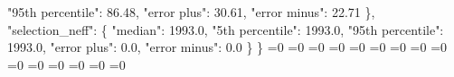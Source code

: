 {{        "95th percentile": 86.48, %
        "error plus": 30.61, %
        "error minus": 22.71%
      \}, %
      "selection\_neff": \{%
        "median": 1993.0, %
        "5th percentile": 1993.0, %
        "95th percentile": 1993.0, %
        "error plus": 0.0, %
        "error minus": 0.0%
      \}%
    \}}%
  \else%
    \ifnum{}=0%
      \let\MagTruncnormIidTiltIsotropicTruncnormNnd@I@out\MagTruncnormIidTiltIsotropicTruncnormNnd@III%
    \else%
      \ifnum{}=0%
      \let\MagTruncnormIidTiltIsotropicTruncnormNnd@I@out\MagTruncnormIidTiltIsotropicTruncnormNnd@IV%
    \else%
      \ifnum{}=0%
      \let\MagTruncnormIidTiltIsotropicTruncnormNnd@I@out\MagTruncnormIidTiltIsotropicTruncnormNnd@V%
    \else%
      \ifnum{}=0%
      \let\MagTruncnormIidTiltIsotropicTruncnormNnd@I@out\MagTruncnormIidTiltIsotropicTruncnormNnd@VI%
    \else%
      \ifnum{}=0%
      \let\MagTruncnormIidTiltIsotropicTruncnormNnd@I@out\MagTruncnormIidTiltIsotropicTruncnormNnd@VII%
    \else%
      \ifnum{}=0%
      \let\MagTruncnormIidTiltIsotropicTruncnormNnd@I@out\MagTruncnormIidTiltIsotropicTruncnormNnd@VIII%
    \else%
      \ifnum{}=0%
      \let\MagTruncnormIidTiltIsotropicTruncnormNnd@I@out\MagTruncnormIidTiltIsotropicTruncnormNnd@IX%
    \else%
      \ifnum{}=0%
      \let\MagTruncnormIidTiltIsotropicTruncnormNnd@I@out\MagTruncnormIidTiltIsotropicTruncnormNnd@X%
    \else%
      \ifnum{}=0%
      \let\MagTruncnormIidTiltIsotropicTruncnormNnd@I@out\MagTruncnormIidTiltIsotropicTruncnormNnd@XI%
    \else%
      \ifnum{}=0%
      \let\MagTruncnormIidTiltIsotropicTruncnormNnd@I@out\MagTruncnormIidTiltIsotropicTruncnormNnd@XII%
    \else%
      \ifnum{}=0%
      \let\MagTruncnormIidTiltIsotropicTruncnormNnd@I@out\MagTruncnormIidTiltIsotropicTruncnormNnd@XIII%
    \else%
      \ifnum{}=0%
      \let\MagTruncnormIidTiltIsotropicTruncnormNnd@I@out\MagTruncnormIidTiltIsotropicTruncnormNnd@XIV%
    \else%
      \ifnum{}=0%
      \let\MagTruncnormIidTiltIsotropicTruncnormNnd@I@out\MagTruncnormIidTiltIsotropicTruncnormNnd@XV%
    \else%
      \ifnum{}=0%
      \let\MagTruncnormIidTiltIsotropicTruncnormNnd@I@out\MagTruncnormIidTiltIsotropicTruncnormNnd@XVI%
    \else%
      \ifnum{}=0%
      \let\MagTruncnormIidTiltIsotropicTruncnormNnd@I@out\MagTruncnormIidTiltIsotropicTruncnormNnd@XVII%
}
